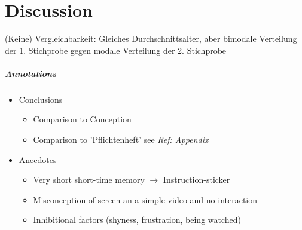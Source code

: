 \chapter{Discussion}
\label{discussion}

(Keine) Vergleichbarkeit: Gleiches Durchschnittsalter, aber bimodale Verteilung der 1. Stichprobe gegen modale Verteilung der 2. Stichprobe

\paragraph{Annotations}

\begin{itemize}
	\item Conclusions
	\begin{itemize}
		\item Comparison to Conception
		\item Comparison to 'Pflichtenheft' see \textit{Ref: Appendix}
	\end{itemize}
	\item Anecdotes
	\begin{itemize}
		\item Very short short-time memory $\to$ Instruction-sticker
		\item Misconception of screen an a simple video and no interaction
		\item Inhibitional factors (shyness, frustration, being watched)
	\end{itemize}
\end{itemize}